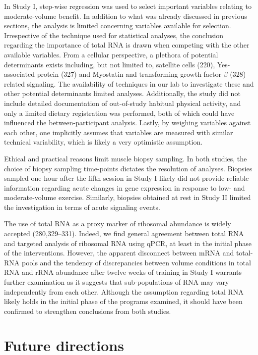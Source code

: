 \documentclass[twoside,10pt]{gihclass} %
\begin{document}
In Study I, step-wise regression was used to select important variables relating to moderate-volume benefit. In addition to what was already discussed in previous sections, the analysis is limited concerning variables available for selection. Irrespective of the technique used for statistical analyses, the conclusion regarding the importance of total RNA is drawn when competing with the other available variables. From a cellular perspective, a plethora of potential determinants exists including, but not limited to,
satellite cells (220),
Yes-associated protein (327) and
Myostatin and transforming growth factor-\(\beta\) (328)
-related signaling. The availability of techniques in our lab to investigate these and other potential determinants limited analyses.
Additionally, the study did not include detailed documentation of out-of-study habitual physical activity, and only a limited dietary registration was performed, both of which could have influenced the between-participant analysis.
Lastly, by weighing variables against each other, one implicitly assumes that variables are measured with similar technical variability, which is likely a very optimistic assumption.

Ethical and practical reasons limit muscle biopsy sampling. In both studies, the choice of biopsy sampling time-points dictates the resolution of analyses. Biopsies sampled one hour after the fifth session in Study I likely did not provide reliable information regarding acute changes in gene expression in response to low- and moderate-volume exercise. Similarly, biopsies obtained at rest in Study II limited the investigation in terms of acute signaling events.

The use of total RNA as a proxy marker of ribosomal abundance is widely accepted
(280,329--331).
Indeed, we find general agreement between total RNA and targeted analysis of ribosomal RNA using qPCR, at least in the initial phase of the interventions. However, the apparent disconnect between mRNA and total-RNA pools and the tendency of discrepancies between volume conditions in total RNA and rRNA abundance after twelve weeks of training in Study I warrants further examination as it suggests that sub-populations of RNA may vary independently from each other. Although the assumption regarding total RNA likely holds in the initial phase of the programs examined, it should have been confirmed to strengthen conclusions from both studies.

\hypertarget{future-directions}{%
\section{Future directions}\label{future-directions}}
\end{document}
